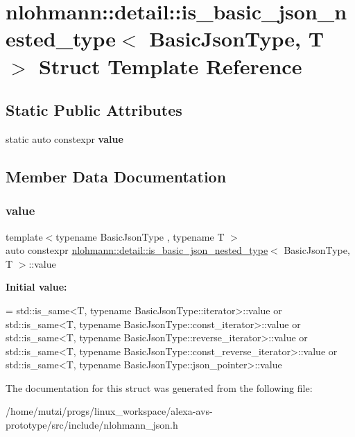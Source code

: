 \hypertarget{structnlohmann_1_1detail_1_1is__basic__json__nested__type}{}\section{nlohmann\+:\+:detail\+:\+:is\+\_\+basic\+\_\+json\+\_\+nested\+\_\+type$<$ Basic\+Json\+Type, T $>$ Struct Template Reference}
\label{structnlohmann_1_1detail_1_1is__basic__json__nested__type}
\subsection*{Static Public Attributes}
\begin{DoxyCompactItemize}
\item 
static auto constexpr {\bfseries value}
\end{DoxyCompactItemize}


\subsection{Member Data Documentation}
\mbox{\label{structnlohmann_1_1detail_1_1is__basic__json__nested__type_aee5fee744e5298a78d557f2ee5f090db}} 
\subsubsection{\texorpdfstring{value}{value}}
{\footnotesize\ttfamily template$<$typename Basic\+Json\+Type , typename T $>$ \\
auto constexpr \hyperlink{structnlohmann_1_1detail_1_1is__basic__json__nested__type}{nlohmann\+::detail\+::is\+\_\+basic\+\_\+json\+\_\+nested\+\_\+type}$<$ Basic\+Json\+Type, T $>$\+::value\hspace{0.3cm}{\ttfamily [static]}}

{\bfseries Initial value\+:}
\begin{DoxyCode}
= std::is\_same<T, typename BasicJsonType::iterator>::value or
                                  std::is\_same<T, typename BasicJsonType::const\_iterator>::value or
                                  std::is\_same<T, typename BasicJsonType::reverse\_iterator>::value or
                                  std::is\_same<T, typename BasicJsonType::const\_reverse\_iterator>::value or
                                  std::is\_same<T, typename BasicJsonType::json\_pointer>::value
\end{DoxyCode}


The documentation for this struct was generated from the following file\+:\begin{DoxyCompactItemize}
\item 
/home/mutzi/progs/linux\+\_\+workspace/alexa-\/avs-\/prototype/src/include/nlohmann\+\_\+json.\+h\end{DoxyCompactItemize}
